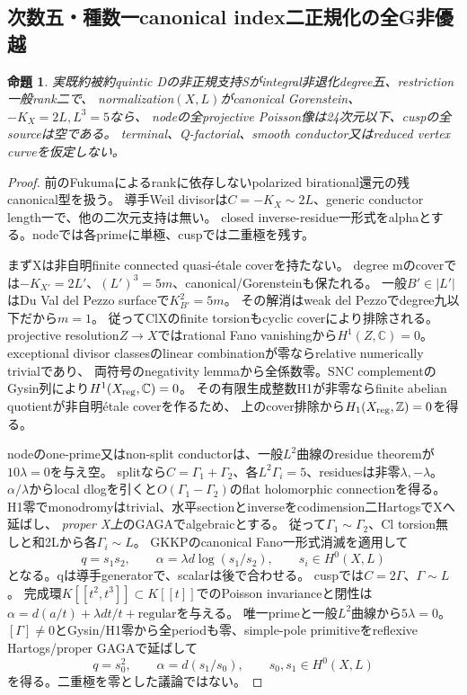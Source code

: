 \documentclass[a4paper,11pt]{ltjsarticle}
\newtheorem{proposition}{命題}[section]
\theoremstyle{definition}
\begin{document}
\subsection{次数五・種数一canonical index二正規化の全G非優越}
\begin{proposition}\label{prop:ranktwo-quintic-canonical-index-two-G}
実既約被約quintic Dの非正規支持Sがintegral非退化degree五、restriction一般rank二で、
normalization$(X,L)$がcanonical Gorenstein、$-K_X=2L,L^3=5$なら、
nodeの全projective Poisson像は24次元以下、cuspの全sourceは空である。
terminal、Q-factorial、smooth conductor又はreduced vertex curveを仮定しない。
\end{proposition}
\begin{proof}
前のFukumaによるrankに依存しないpolarized birational還元の残canonical型を扱う。
導手Weil divisorは$C=-K_X\sim2L$、generic conductor length一で、他の二次元支持は無い。
closed inverse-residue一形式をalphaとする。nodeでは各primeに単極、cuspでは二重極を残す。

まずXは非自明finite connected quasi-étale coverを持たない。
degree mのcoverでは$-K_{X'}=2L'$、$(L')^3=5m$、canonical/Gorensteinも保たれる。
一般$B'\in|L'|$はDu Val del Pezzo surfaceで$K_{B'}^2=5m$。
その解消はweak del Pezzoでdegree九以下だから$m=1$。
従ってClXのfinite torsionもcyclic coverにより排除される。
projective resolution$Z\to X$ではrational Fano vanishingから$H^1(Z,\mathbb C)=0$。
exceptional divisor classesのlinear combinationが零ならrelative numerically trivialであり、
両符号のnegativity lemmaから全係数零。SNC complementのGysin列により$H^1(X_{\rm reg},\mathbb C)=0$。
その有限生成整数H1が非零ならfinite abelian quotientが非自明étale coverを作るため、
上のcover排除から$H_1(X_{\rm reg},\mathbb Z)=0$を得る。

nodeのone-prime又はnon-split conductorは、一般$L^2$曲線のresidue theoremが$10\lambda=0$を与え空。
splitなら$C=\Gamma_1+\Gamma_2$、各$L^2\Gamma_i=5$、residuesは非零$\lambda,-\lambda$。
$\alpha/\lambda$からlocal dlogを引くと$O(\Gamma_1-\Gamma_2)$のflat holomorphic connectionを得る。
H1零でmonodromyはtrivial、水平sectionとinverseをcodimension二HartogsでXへ延ばし、
\emph{proper X上}のGAGAでalgebraicとする。
従って$\Gamma_1\sim\Gamma_2$、Cl torsion無しと和2Lから各$\Gamma_i\sim L$。
GKKPのcanonical Fano一形式消滅を適用して
\[
 q=s_1s_2,\qquad \alpha=\lambda d\log(s_1/s_2),\qquad s_i\in H^0(X,L)
\]
となる。qは導手generatorで、scalarは後で合わせる。
cuspでは$C=2\Gamma$、$\Gamma\sim L$。
完成環$K[[t^2,t^3]]\subset K[[t]]$でのPoisson invarianceと閉性は
$\alpha=d(a/t)+\lambda dt/t+\text{regular}$を与える。
唯一primeと一般$L^2$曲線から$5\lambda=0$。
$[\Gamma]\ne0$とGysin/H1零から全periodも零、simple-pole primitiveをreflexive Hartogs/proper GAGAで延ばして
\[
 q=s_0^2,\qquad \alpha=d(s_1/s_0),\qquad s_0,s_1\in H^0(X,L)
\]
を得る。二重極を零とした議論ではない。


\end{proof}
\end{document}
